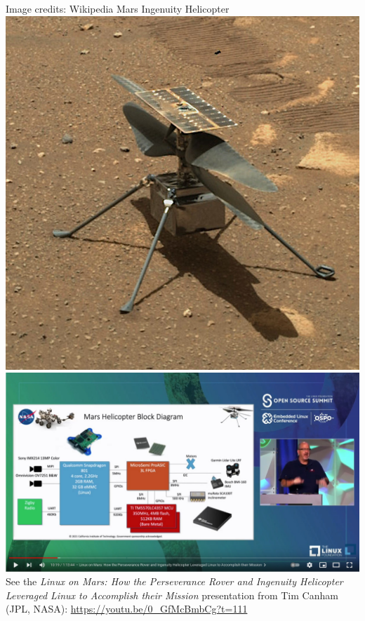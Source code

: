 \begin{frame}
\begin{columns}
  \vspace{0.3cm}
  \tiny Image credits: Wikipedia
  \scriptsize
  Mars Ingenuity Helicopter\\
  \includegraphics[height=0.3\textheight]{slides/sysdev-intro/mars-helicopter.jpg}\\
  \includegraphics[height=0.3\textheight]{slides/sysdev-intro/mars-helicopter-video.jpg}\\
  \vspace{0.5cm}
  \tiny
  See the {\em Linux on Mars: How the Perseverance Rover and Ingenuity Helicopter Leveraged
  Linux to Accomplish their Mission} presentation from Tim Canham (JPL, NASA):
  \url{https://youtu.be/0_GfMcBmbCg?t=111}
  \end{columns}
\end{frame}

